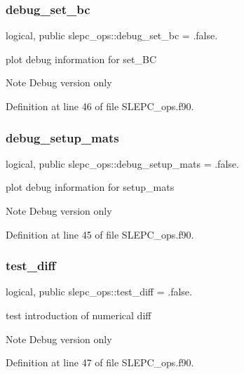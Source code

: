 \subsubsection{\texorpdfstring{debug\+\_\+set\+\_\+bc}{debug\_set\_bc}}
{\footnotesize\ttfamily logical, public slepc\+\_\+ops\+::debug\+\_\+set\+\_\+bc = .false.}



plot debug information for set\+\_\+\+BC 

\begin{DoxyNote}{Note}
Debug version only 
\end{DoxyNote}


Definition at line 46 of file S\+L\+E\+P\+C\+\_\+ops.\+f90.

\mbox{\label{namespaceslepc__ops_aff5aa0d485bc34e2f6e320172fcc4ccb}} 
\subsubsection{\texorpdfstring{debug\+\_\+setup\+\_\+mats}{debug\_setup\_mats}}
{\footnotesize\ttfamily logical, public slepc\+\_\+ops\+::debug\+\_\+setup\+\_\+mats = .false.}



plot debug information for setup\+\_\+mats 

\begin{DoxyNote}{Note}
Debug version only 
\end{DoxyNote}


Definition at line 45 of file S\+L\+E\+P\+C\+\_\+ops.\+f90.

\mbox{\label{namespaceslepc__ops_a57d0ef4131e939894b34bb07e30e631b}} 
\subsubsection{\texorpdfstring{test\+\_\+diff}{test\_diff}}
{\footnotesize\ttfamily logical, public slepc\+\_\+ops\+::test\+\_\+diff = .false.}



test introduction of numerical diff 

\begin{DoxyNote}{Note}
Debug version only 
\end{DoxyNote}


Definition at line 47 of file S\+L\+E\+P\+C\+\_\+ops.\+f90.

